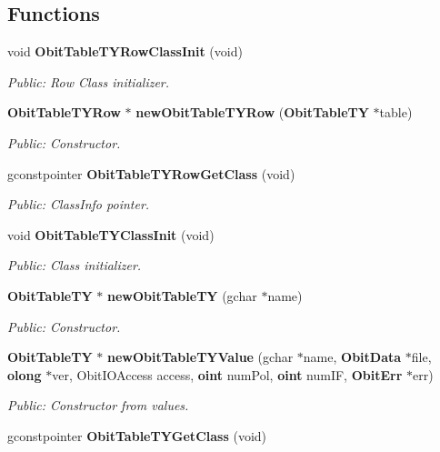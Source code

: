 \subsection*{Functions}
\begin{CompactItemize}
\item 
void {\bf Obit\-Table\-TYRow\-Class\-Init} (void)
\begin{CompactList}\small\item\em Public: Row Class initializer. \item\end{CompactList}\item 
{\bf Obit\-Table\-TYRow} $\ast$ {\bf new\-Obit\-Table\-TYRow} ({\bf Obit\-Table\-TY} $\ast$table)
\begin{CompactList}\small\item\em Public: Constructor. \item\end{CompactList}\item 
gconstpointer {\bf Obit\-Table\-TYRow\-Get\-Class} (void)
\begin{CompactList}\small\item\em Public: Class\-Info pointer. \item\end{CompactList}\item 
void {\bf Obit\-Table\-TYClass\-Init} (void)
\begin{CompactList}\small\item\em Public: Class initializer. \item\end{CompactList}\item 
{\bf Obit\-Table\-TY} $\ast$ {\bf new\-Obit\-Table\-TY} (gchar $\ast$name)
\begin{CompactList}\small\item\em Public: Constructor. \item\end{CompactList}\item 
{\bf Obit\-Table\-TY} $\ast$ {\bf new\-Obit\-Table\-TYValue} (gchar $\ast$name, {\bf Obit\-Data} $\ast$file, {\bf olong} $\ast$ver, Obit\-IOAccess access, {\bf oint} num\-Pol, {\bf oint} num\-IF, {\bf Obit\-Err} $\ast$err)
\begin{CompactList}\small\item\em Public: Constructor from values. \item\end{CompactList}\item 
gconstpointer {\bf Obit\-Table\-TYGet\-Class} (void)

\end{CompactItemize}
